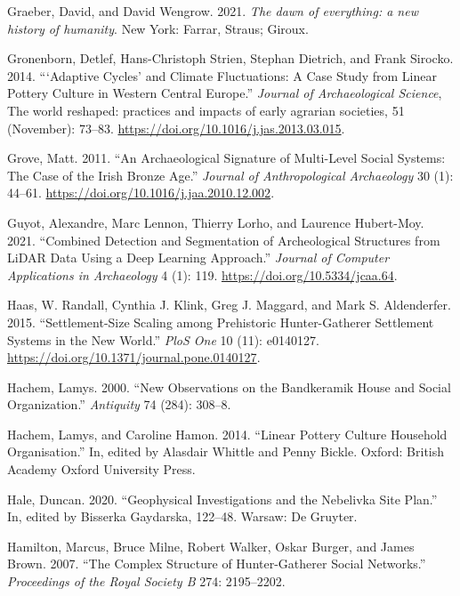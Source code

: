 \documentclass[
  12pt,
  a4paper, twoside]{book}
\newlength{\cslhangindent}
\newlength{\cslentryspacingunit} %
\newenvironment{CSLReferences}[2] %
 {%
  \setlength{\parindent}{0pt}
  \ifodd #1
  \let\oldpar\par
  \def\par{\hangindent=\cslhangindent\oldpar}
  \fi
  \setlength{\parskip}{#2\cslentryspacingunit}
 }%
 {}
\begin{document}
\begin{CSLReferences}{1}{0}
\leavevmode{}%
Graeber, David, and David Wengrow. 2021. \emph{The dawn of everything: a new history of humanity}. New York: Farrar, Straus; Giroux.

\leavevmode{}%
Gronenborn, Detlef, Hans-Christoph Strien, Stephan Dietrich, and Frank Sirocko. 2014. {``{`}Adaptive Cycles{'} and Climate Fluctuations: A Case Study from Linear Pottery Culture in Western Central Europe.''} \emph{Journal of Archaeological Science}, The world reshaped: practices and impacts of early agrarian societies, 51 (November): 73--83. \url{https://doi.org/10.1016/j.jas.2013.03.015}.

\leavevmode{}%
Grove, Matt. 2011. {``An Archaeological Signature of Multi-Level Social Systems: The Case of the Irish Bronze Age.''} \emph{Journal of Anthropological Archaeology} 30 (1): 44--61. \url{https://doi.org/10.1016/j.jaa.2010.12.002}.

\leavevmode{}%
Guyot, Alexandre, Marc Lennon, Thierry Lorho, and Laurence Hubert-Moy. 2021. {``Combined Detection and Segmentation of Archeological Structures from LiDAR Data Using a Deep Learning Approach.''} \emph{Journal of Computer Applications in Archaeology} 4 (1): 119. \url{https://doi.org/10.5334/jcaa.64}.

\leavevmode{}%
Haas, W. Randall, Cynthia J. Klink, Greg J. Maggard, and Mark S. Aldenderfer. 2015. {``Settlement-Size Scaling among Prehistoric Hunter-Gatherer Settlement Systems in the New World.''} \emph{PloS One} 10 (11): e0140127. \url{https://doi.org/10.1371/journal.pone.0140127}.

\leavevmode{}%
Hachem, Lamys. 2000. {``New Observations on the Bandkeramik House and Social Organization.''} \emph{Antiquity} 74 (284): 308--8.

\leavevmode{}%
Hachem, Lamys, and Caroline Hamon. 2014. {``Linear Pottery Culture Household Organisation.''} In, edited by Alasdair Whittle and Penny Bickle. Oxford: British Academy Oxford University Press.

\leavevmode{}%
Hale, Duncan. 2020. {``Geophysical Investigations and the Nebelivka Site Plan.''} In, edited by Bisserka Gaydarska, 122--48. Warsaw: De Gruyter.

\leavevmode{}%
Hamilton, Marcus, Bruce Milne, Robert Walker, Oskar Burger, and James Brown. 2007. {``The Complex Structure of Hunter-Gatherer Social Networks.''} \emph{Proceedings of the Royal Society B} 274: 2195--2202.


\end{CSLReferences}
\end{document}
